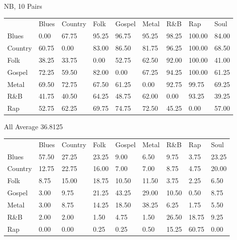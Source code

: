 \documentclass[a4paper,oneside]{article}
\begin{document}
NB, 10
Pairs
\begin{table}
\begin{tabular}{|l||*{8}{l|}} \hline
 & Blues & Country & Folk & Gospel & Metal & R\&B & Rap & Soul \\ \hhline{|=||*{8}{=|}}
Blues & 0.00 & 67.75 & 95.25 & 96.75 & 95.25 & 98.25 & 100.00 & 84.00 \\ \hline
Country & 60.75 & 0.00 & 83.00 & 86.50 & 81.75 & 96.25 & 100.00 & 68.50 \\ \hline
Folk & 38.25 & 33.75 & 0.00 & 52.75 & 62.50 & 92.00 & 100.00 & 41.00 \\ \hline
Gospel & 72.25 & 59.50 & 82.00 & 0.00 & 67.25 & 94.25 & 100.00 & 61.25 \\ \hline
Metal & 69.50 & 72.75 & 67.50 & 61.25 & 0.00 & 92.75 & 99.75 & 69.25 \\ \hline
R\&B & 41.75 & 40.50 & 64.25 & 48.75 & 62.00 & 0.00 & 93.25 & 39.25 \\ \hline
Rap & 52.75 & 62.25 & 69.75 & 74.75 & 72.50 & 45.25 & 0.00 & 57.00 \\ \hline
\end{tabular}
\end{table}

All
Average 36.8125
\begin{table}
\begin{tabular}{|l||*{8}{l|}} \hline
&	Blues & Country & Folk & Gospel & Metal & R\&B & Rap & Soul \\ \hhline{|=||*{8}{=|}}
Blues & 57.50 & 27.25 & 23.25 & 9.00 & 6.50 & 9.75 & 3.75 & 23.25 \\ \hline
Country & 12.75 & 22.75 & 16.00 & 7.00 & 7.00 & 8.75 & 4.75 & 20.00 \\ \hline
Folk & 8.75 & 15.00 & 18.75 & 10.50 & 11.50 & 3.75 & 2.25 & 6.50 \\ \hline
Gospel & 3.00 & 9.75 & 21.25 & 43.25 & 29.00 & 10.50 & 0.50 & 8.75 \\ \hline
Metal & 3.00 & 8.75 & 14.25 & 18.50 & 38.25 & 6.25 & 1.75 & 5.50 \\ \hline
R\&B & 2.00 & 2.00 & 1.50 & 4.75 & 1.50 & 26.50 & 18.75 & 9.25 \\ \hline
Rap & 0.00 & 0.00 & 0.25 & 0.25 & 0.50 & 15.25 & 60.75 & 0.00 \\ \hline
\end{tabular}
\end{table}
\end{document}
